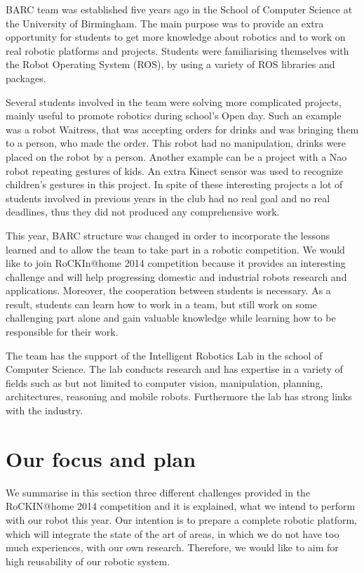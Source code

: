 \documentclass[conference]{IEEEtran}
\begin{document}
BARC team was established five years ago in the School of Computer Science at the University of Birmingham. The main purpose was to provide an extra opportunity for students to get more knowledge about robotics and to work on real robotic platforms and projects. Students were familiarising themselves with the Robot Operating System (ROS), by using a variety of ROS libraries and packages. %

Several students involved in the team were solving more complicated projects, mainly useful to promote robotics during school's Open day. Such an example was a robot Waitress, that was accepting orders for drinks and was bringing them to a person, who made the order. This robot had no manipulation, drinks were placed on the robot by a person. Another example can be a project with a Nao robot repeating gestures of kids. An extra Kinect sensor was used to recognize children's gestures in this project. In spite of these interesting projects a lot of students involved in previous years in the club had no real goal and no real deadlines, thus they did not produced any comprehensive work.

This year, BARC structure was changed in order to incorporate the lessons learned and to allow the team to take part in a robotic competition. We would like to join RoCKIn@home 2014 competition because it provides an interesting challenge and will help progressing domestic and industrial robots research and applications. Moreover, the cooperation between students is necessary. As a result, students can learn how to work in a team, but still work on some challenging part alone and gain valuable knowledge while learning how to be responsible for their work.

The team has the support of the Intelligent Robotics Lab \cite{irlab} in the school of Computer Science. The lab conducts research and has expertise in a variety of fields such as but not limited to computer vision, manipulation, planning, architectures, reasoning and mobile robots. Furthermore the lab has strong links with the industry. 

 
\section{Our focus and plan}
We summarise in this section three different challenges provided in the RoCKIN@home 2014 competition and it is explained, what we intend to perform with our robot this year. Our intention is to prepare a complete robotic platform, which will integrate the state of the art of areas, in which we do not have too much experiences, with our own research. Therefore, we would like to aim for high reusability of our robotic system. 
\end{document}
